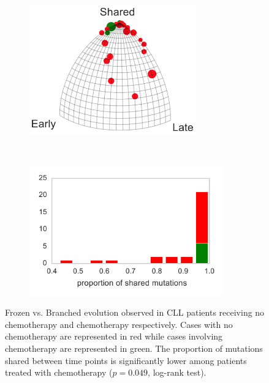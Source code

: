 \documentclass[a4paper,11pt]{article}
\begin{document}
\begin{figure}
    \begin{subfigure}{0.5\linewidth}
    \centering
    \includegraphics[height=2.2in]{../figures/CLL_triplet.png}
    \end{subfigure}
    ~
    \begin{subfigure}{0.5\linewidth}
    \centering
    \includegraphics[height=2.2in]{../figures/CLL_histogram.pdf}
    \end{subfigure}

    \caption{Frozen vs. Branched evolution observed in CLL patients receiving no chemotherapy and chemotherapy respectively. Cases with no chemotherapy are represented in red while cases involving chemotherapy are represented in green. The proportion of mutations shared between time points is significantly lower among patients treated with chemotherapy ($p = 0.049$, log-rank test).}
    \label{fig:chemoCLL}
\end{figure}
\end{document}
